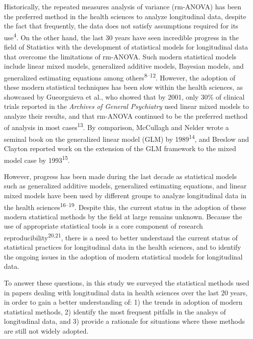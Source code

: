 \documentclass[
]{article}
\begin{document}
Historically, the repeated measures analysis of variance (rm-ANOVA) has
been the preferred method in the health sciences to analyze longitudinal
data, despite the fact that frequently, the data does not satisfy
assumptions required for its use\textsuperscript{4}. On the other hand,
the last 30 years have seen incredible progress in the field of
Statistics with the development of statistical models for longitudinal
data that overcome the limitations of rm-ANOVA. Such modern statistical
models include linear mixed models, generalized additive models,
Bayesian models, and generalized estimating equations among
others\textsuperscript{8--12}. However, the adoption of these modern
statistical techniques has been slow within the health sciences, as
showcased by Gueorguieva et al., who showed that by 2001, only 30\% of
clinical trials reported in the \emph{Archives of General Psychiatry}
used linear mixed models to analyze their results, and that rm-ANOVA
continued to be the preferred method of analysis in most
cases\textsuperscript{13}. By comparison, McCullagh and Nelder wrote a
seminal book on the generalized linear model (GLM) by
1989\textsuperscript{14}, and Breslow and Clayton reported work on the
extension of the GLM framework to the mixed model case by
1993\textsuperscript{15}.

However, progress has been made during the last decade as statistical
models such as generalized additive models, generalized estimating
equations, and linear mixed models have been used by different groups to
analyze longitudinal data in the health
sciences\textsuperscript{16--19}. Despite this, the current status in
the adoption of these modern statistical methods by the field at large
remains unknown. Because the use of appropriate statistical tools is a
core component of research reproducibility\textsuperscript{20,21}, there
is a need to better understand the current status of statistical
practices for longitudinal data in the health sciences, and to identify
the ongoing issues in the adoption of modern statistical models for
longitudinal data.

To answer these questions, in this study we surveyed the statistical
methods used in papers dealing with longitudinal data in health sciences
over the last 20 years, in order to gain a better understanding of: 1)
the trends in adoption of modern statistical methods, 2) identify the
most frequent pitfalls in the analsys of longitudinal data, and 3)
provide a rationale for situations where these methods are still not
widely adopted.
\end{document}
